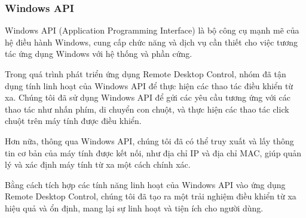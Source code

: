 \subsubsection{Windows API}
Windows API (Application Programming Interface) là bộ công cụ mạnh mẽ của hệ điều hành Windows, cung cấp chức năng và dịch vụ cần thiết cho việc tương tác ứng dụng Windows với hệ thống và phần cứng.

Trong quá trình phát triển ứng dụng Remote Desktop Control, nhóm đã tận dụng tính linh hoạt của Windows API để thực hiện các thao tác điều khiển từ xa. Chúng tôi đã sử dụng Windows API để gửi các yêu cầu tương ứng với các thao tác như nhấn phím, di chuyển con chuột, và thực hiện các thao tác click chuột trên máy tính được điều khiển.

Hơn nữa, thông qua Windows API, chúng tôi đã có thể truy xuất và lấy thông tin cơ bản của máy tính được kết nối, như địa chỉ IP và địa chỉ MAC, giúp quản lý và xác định máy tính từ xa một cách chính xác.

Bằng cách tích hợp các tính năng linh hoạt của Windows API vào ứng dụng Remote Desktop Control, chúng tôi đã tạo ra một trải nghiệm điều khiển từ xa hiệu quả và ổn định, mang lại sự linh hoạt và tiện ích cho người dùng.
